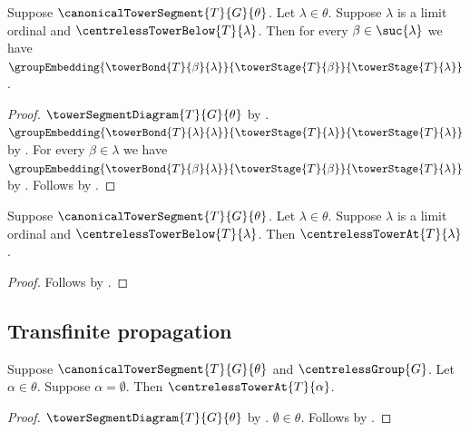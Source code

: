 \begin{proposition}\label{centreless_tower_limit_bonds}
    Suppose $\canonicalTowerSegment{T}{G}{\theta}$.
    Let $\lambda\in\theta$.
    Suppose $\lambda$ is a limit ordinal and
        $\centrelessTowerBelow{T}{\lambda}$.
    Then for every $\beta\in\suc{\lambda}$ we have
        $\groupEmbedding
            {\towerBond{T}{\beta}{\lambda}}
            {\towerStage{T}{\beta}}
            {\towerStage{T}{\lambda}}$.
\end{proposition}
\begin{proof}
    $\towerSegmentDiagram{T}{G}{\theta}$ by
        .
    $\groupEmbedding
        {\towerBond{T}{\lambda}{\lambda}}
        {\towerStage{T}{\lambda}}
        {\towerStage{T}{\lambda}}$ by
        .
    For every $\beta\in\lambda$ we have
        $\groupEmbedding
            {\towerBond{T}{\beta}{\lambda}}
            {\towerStage{T}{\beta}}
            {\towerStage{T}{\lambda}}$ by
        .
    Follows by .
\end{proof}

\begin{proposition}\label{centreless_tower_at_limit}
    Suppose $\canonicalTowerSegment{T}{G}{\theta}$.
    Let $\lambda\in\theta$.
    Suppose $\lambda$ is a limit ordinal and
        $\centrelessTowerBelow{T}{\lambda}$.
    Then $\centrelessTowerAt{T}{\lambda}$.
\end{proposition}
\begin{proof}
    Follows by
        .
\end{proof}

\subsection{Transfinite propagation}

\begin{proposition}\label{canonical_centreless_tower_zero_case}
    Suppose $\canonicalTowerSegment{T}{G}{\theta}$ and
        $\centrelessGroup{G}$.
    Let $\alpha\in\theta$.
    Suppose $\alpha=\emptyset$.
    Then $\centrelessTowerAt{T}{\alpha}$.
\end{proposition}
\begin{proof}
    $\towerSegmentDiagram{T}{G}{\theta}$ by
        .
    $\emptyset\in\theta$.
    Follows by .
\end{proof}

